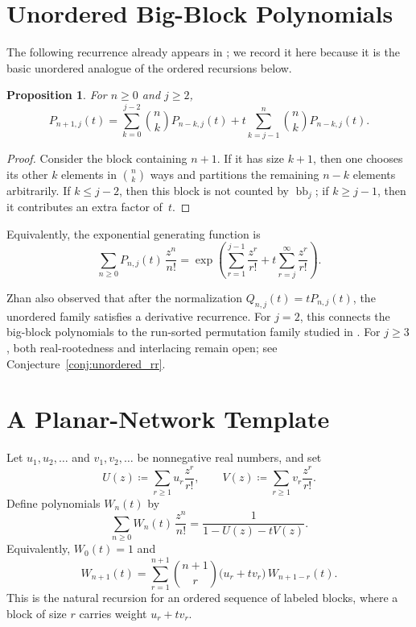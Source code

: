 \documentclass[11pt,reqno]{amsart}
\newtheorem{proposition}[theorem]{Proposition}
\theoremstyle{definition}
\begin{document}
\section{Unordered Big-Block Polynomials}

The following recurrence already appears in \cite[Lem.~3.2]{Zhan2023}; we
record it here because it is the basic unordered analogue of the ordered
recursions below.

\begin{proposition}\label{prop:unordered_recur}
For $n \geq 0$ and $j \geq 2$,
\begin{equation}\label{eq:unordered_recur}
  P_{n+1,j}(t)
  =
  \sum_{k=0}^{j-2} \binom{n}{k} P_{n-k,j}(t)
  + t \sum_{k=j-1}^{n} \binom{n}{k} P_{n-k,j}(t).
\end{equation}
\end{proposition}

\begin{proof}
Consider the block containing $n+1$. If it has size $k+1$, then one chooses
its other $k$ elements in $\binom{n}{k}$ ways and partitions the remaining
$n-k$ elements arbitrarily. If $k \leq j-2$, then this block is not counted by
$\operatorname{bb}_j$; if $k \geq j-1$, then it contributes an extra factor
of~$t$.
\end{proof}

Equivalently, the exponential generating function is
\begin{equation}\label{eq:unordered_egf}
  \sum_{n \geq 0} P_{n,j}(t)\,\frac{z^n}{n!}
  =
  \exp\!\left(
    \sum_{r=1}^{j-1} \frac{z^r}{r!}
    +
    t \sum_{r=j}^{\infty} \frac{z^r}{r!}
  \right).
\end{equation}

Zhan also observed that after the normalization \(Q_{n,j}(t)=tP_{n,j}(t)\), the
unordered family satisfies a derivative recurrence. For \(j=2\), this connects
the big-block polynomials to the run-sorted permutation family studied in
\cite{AlexanderssonNabawanda2021,BonaHezo2016,Zhan2023}. For \(j\ge 3\), both
real-rootedness and interlacing remain open; see
Conjecture~\ref{conj:unordered_rr}.

\section{A Planar-Network Template}

Let \(u_1,u_2,\dotsc\) and \(v_1,v_2,\dotsc\) be nonnegative real numbers, and
set
\[
  U(z)\coloneqq \sum_{r\geq 1} u_r \frac{z^r}{r!},
  \qquad
  V(z)\coloneqq \sum_{r\geq 1} v_r \frac{z^r}{r!}.
\]
Define polynomials \(W_n(t)\) by
\begin{equation}\label{eq:template_egf}
  \sum_{n \geq 0} W_n(t)\,\frac{z^n}{n!}
  =
  \frac{1}{1-U(z)-tV(z)}.
\end{equation}
Equivalently, \(W_0(t)=1\) and
\begin{equation}\label{eq:template_recur}
  W_{n+1}(t)
  =
  \sum_{r=1}^{n+1} \binom{n+1}{r}\bigl(u_r+t v_r\bigr)\,W_{n+1-r}(t).
\end{equation}
This is the natural recursion for an ordered sequence of labeled blocks, where
a block of size \(r\) carries weight \(u_r+t v_r\).
\end{document}
